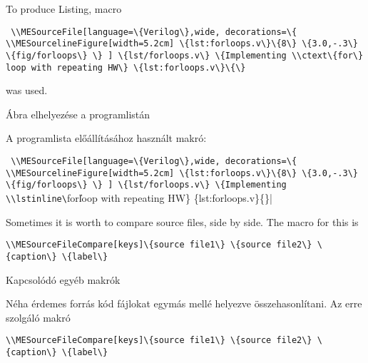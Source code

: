 {
To produce Listing\ao{ \ref{lst:forloops.v}},
 macro
\par\noindent\lstinline|
\\MESourceFile[language=\{Verilog\},wide,
decorations=\{
\\MESourcelineFigure[width=5.2cm] \{lst:forloops.v\}\{8\} \{3.0,-.3\} \{fig/forloops\}
\}
] \{lst/forloops.v\} \{Implementing \\ctext\{for\} loop with repeating HW\} \{lst:forloops.v\}\{\}|
\par\noindent was used.

}
{Ábra elhelyezése a programlistán}
{
A \ao{\ref{lst:forloops.v}} programlista előállításához használt makró:
\par\noindent\lstinline|
\\MESourceFile[language=\{Verilog\},wide,
decorations=\{
\\MESourcelineFigure[width=5.2cm] \{lst:forloops.v\}\{8\} \{3.0,-.3\} \{fig/forloops\}
\}
] \{lst/forloops.v\} \{Implementing \\lstinline\|for\| loop with repeating HW\} \{lst:forloops.v\}\{\}|

}





{
Sometimes it is worth to compare source files, side by side.
The macro for this is
\par\noindent\lstinline|\\MESourceFileCompare[keys]\{source file1\} \{source file2\} \{caption\} \{label\}|
}
{Kapcsolódó egyéb makrók}
{
Néha érdemes forrás kód fájlokat egymás mellé helyezve összehasonlítani.
Az erre szolgáló makró
\par\noindent\lstinline|\\MESourceFileCompare[keys]\{source file1\} \{source file2\} \{caption\} \{label\}|
}

